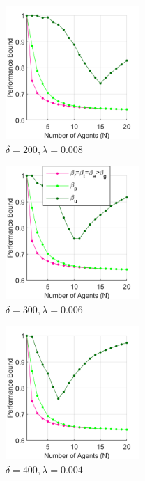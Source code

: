 \documentclass[conference]{IEEEtran}
\begin{document}
\begin{figure}[t]
    \centering
    \begin{subfigure}[t]{0.33\textwidth}
        \centering
        \includegraphics[width=2in]{Figures/Maze4.png}
        \caption{$\delta = 200, \lambda = 0.008$}
    \end{subfigure}%
    \hfill
    \begin{subfigure}[t]{0.33\textwidth}
        \centering
        \includegraphics[width=2in]{Figures/Maze1.png}
        \caption{$\delta = 300, \lambda = 0.006$}
    \end{subfigure}
    \hfill
    \begin{subfigure}[t]{0.33\textwidth}
        \centering
        \includegraphics[width=2in]{Figures/Maze2.png}
        \caption{$\delta = 400, \lambda = 0.004$}
    \end{subfigure}
    \\
    \centering
    \begin{subfigure}[t]{0.10\textwidth}
        \centering

\end{subfigure}
\end{figure}
\end{document}
